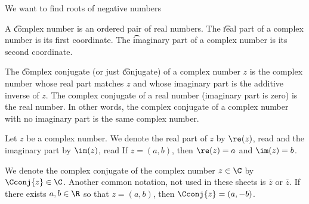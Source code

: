 

We want to find roots of negative numbers


A \t{complex number} is an ordered pair of real numbers.
The \t{real part} of a complex number is its first coordinate.
The \t{imaginary part} of a complex number is its second coordinate.

The \t{complex conjugate} (or just \t{conjugate}) of a complex number $z$ is the complex number whose real part matches $z$ and whose imaginary part is the additive inverse of $z$.
The complex conjugate of a real number (imaginary part is zero) is the real number.
In other words, the complex conjugate of a complex number with no imaginary part is the same complex number.


Let $z$ be a complex number.
We denote the real part of $z$ by $\re(z)$, read  and the imaginary part by $\im(z)$, read 
If $z = (a, b)$, then $\re(z) = a$ and $\im(z) = b$.

We denote the complex conjugate of the complex number $z \in \C$ by $\Cconj{z} \in \C$.
Another common notation, not used in these sheets is $\overline{z}$ or $\bar{z}$.
If there exists $a, b \in \R$ so that $z = (a, b)$, then $\Cconj{z} = (a, -b)$.

\blankpage
